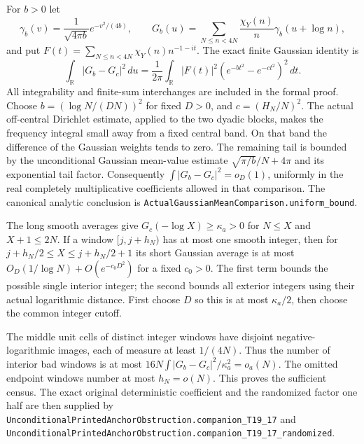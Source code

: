 For $b>0$ let
\[
 \gamma_b(v)=\frac1{\sqrt{4\pi b}}e^{-v^2/(4b)},\qquad
 G_b(u)=\sum_{N\leq n<4N}\frac{\chi_Y(n)}n
                  \gamma_b(u+\log n),
\]
and put
$F(t)=\sum_{N\leq n<4N}\chi_Y(n)n^{-1-it}$.
The exact finite Gaussian identity is
\[
 \int_{\mathbb R}|G_b-G_c|^2\,du
 =\frac1{2\pi}\int_{\mathbb R}|F(t)|^2
                 (e^{-bt^2}-e^{-ct^2})^2\,dt .
\]
All integrability and finite-sum interchanges are included in the
formal proof.
Choose $b=(\log N/(DN))^2$ for fixed $D>0$, and
$c=(H_N/N)^2$.
The actual off-central Dirichlet estimate, applied to the two dyadic
blocks, makes the frequency integral small away from a fixed central
band.  On that band the difference of the Gaussian weights tends to
zero.  The remaining tail is bounded by the unconditional Gaussian
mean-value estimate
$\sqrt{\pi/b}/N+4\pi$ and its exponential tail factor.
Consequently $\int|G_b-G_c|^2=o_D(1)$, uniformly in the real
completely multiplicative coefficients allowed in that comparison.
The canonical analytic conclusion is
\texttt{ActualGaussianMeanComparison.uniform\_bound}.

The long smooth averages give $G_c(-\log X)\geq\kappa_a>0$
for $N\leq X$ and $X+1\leq2N$.
If a window $[j,j+h_N)$ has at most one smooth integer, then for
$j+h_N/2\leq X\leq j+h_N/2+1$ its short Gaussian average is at most
$O_D(1/\log N)+O(e^{-c_0D^2})$ for a fixed $c_0>0$.
The first term bounds the possible single interior integer; the
second bounds all exterior integers using their actual logarithmic
distance.  First choose $D$ so this is at most $\kappa_a/2$, then
choose the common integer cutoff.

The middle unit cells of distinct integer windows have disjoint
negative-logarithmic images, each of measure at least $1/(4N)$.
Thus the number of interior bad windows is at most
$16N\int|G_b-G_c|^2/\kappa_a^2=o_a(N)$.
The omitted endpoint windows number at most $h_N=o(N)$.
This proves the sufficient census.
The exact original deterministic coefficient and the randomized
factor one half are then supplied by
\texttt{UnconditionalPrintedAnchorObstruction.companion\_T19\_17}
and
\texttt{UnconditionalPrintedAnchorObstruction.companion\_T19\_17\_randomized}.

\clearpage
